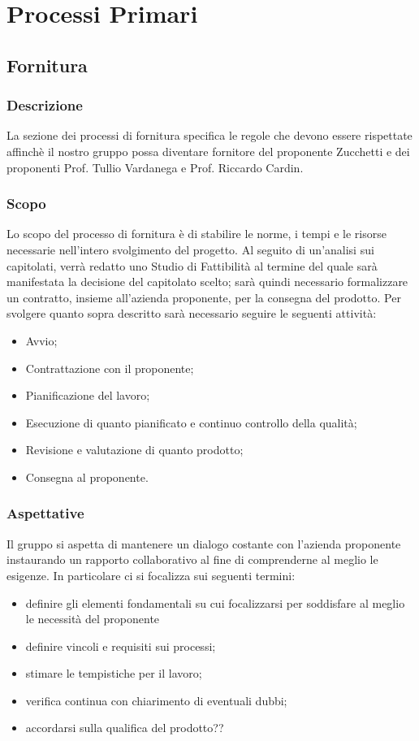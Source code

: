 \section{Processi Primari}

\subsection{Fornitura}
\subsubsection{Descrizione}
La sezione dei processi di fornitura specifica le regole che devono essere rispettate affinchè il nostro gruppo possa diventare fornitore del proponente Zucchetti e dei proponenti Prof. Tullio Vardanega e Prof. Riccardo Cardin.
\subsubsection{Scopo}
Lo scopo del processo di fornitura è di stabilire le norme, i tempi e le risorse necessarie nell'intero svolgimento del progetto.
Al seguito di un'analisi sui capitolati, verrà redatto uno Studio di Fattibilità al termine del quale sarà manifestata la decisione del capitolato scelto; sarà quindi necessario formalizzare un contratto, insieme all'azienda proponente, per la consegna del prodotto. 
Per svolgere quanto sopra descritto sarà necessario seguire le seguenti attività:
\begin{itemize}
	\item Avvio;
	\item Contrattazione con il proponente;
	\item Pianificazione del lavoro;
	\item Esecuzione di quanto pianificato e continuo controllo della qualità;
	\item Revisione e valutazione di quanto prodotto;
	\item Consegna al proponente.
\end{itemize}
\subsubsection{Aspettative}
Il gruppo si aspetta di mantenere un dialogo costante con l'azienda proponente instaurando un rapporto collaborativo al fine di comprenderne al meglio le esigenze. In particolare ci si focalizza sui seguenti termini:
\begin{itemize}
	\item definire gli elementi fondamentali su cui focalizzarsi per soddisfare al meglio le necessità del proponente
	\item definire vincoli e requisiti sui processi;
	\item stimare le tempistiche per il lavoro;
	\item verifica continua con chiarimento di eventuali dubbi;
	\item accordarsi sulla qualifica del prodotto??
\end{itemize}
